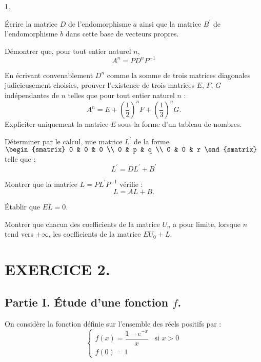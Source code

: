 \documentclass[11pt]{article}%
\begin{document}
\begin{noliste}{1.}
\item Écrire la matrice $D$ de l'endomorphisme $a$ ainsi que la matrice
$B^{\prime }$ de l'endomorphisme $b$ dans cette base de vecteurs
propres.

\item Démontrer que, pour tout entier naturel $n$,
\[
A^{n} = PD^{n}P^{-1}
\]

\item En écrivant convenablement $D^{n}$ comme la somme de trois
matrices diagonales judicieusement choisies, prouver l'existence de
trois
matrices $E$, $F$, $G$ indépendantes de $n$ telles que pour tout entier
naturel $n$ :
\[
A^{n} = E + \left( \frac{1}{2}\right) ^{n}F + \left( \frac{1}{3}\right)
^{n}G.
\]
Expliciter uniquement la matrice $E$ sous la forme d'un tableau de
nombres.

\item Déterminer par le calcul, une matrice $L^{\prime }$ de la forme
$\begin{smatrix}
0 & 0 & 0 \\
0 & p & q \\
0 & 0 & r
\end{smatrix}
$ telle que :
\[
L^{\prime } = DL^{\prime } + B^{\prime }
\]

\item Montrer que la matrice $L = PL^{\prime }P^{-1}$ vérifie : 
\[
L = AL + B.
\]

\item Établir que $EL = 0.$

\item Montrer que chacun des coefficients de la matrice $U_{n}$ a pour
limite, lorsque $n$ tend vers $ + \infty $, les coefficients de la
matrice $EU_{0} + L$.
\end{noliste}

\section*{EXERCICE 2.}

\subsection*{Partie I. Étude d'une fonction $f$.}

On considère la fonction définie sur l'ensemble des réels
positifs par :
\[
\left\{ 
\begin{array}{lc}
f\left( x\right) = \dfrac{1-e^{-x}}{x} & \text{si }x>0 \\
f\left( 0\right) = 1 & 
\end{array}
\right.
\]
\end{document}
